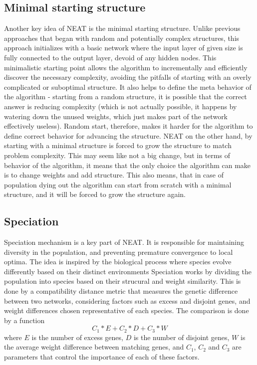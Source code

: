 \documentclass{article}
\begin{document}
\subsection{Minimal starting structure}
Another key idea of NEAT is the minimal starting structure. Unlike previous approaches that began with random and potentially complex structures, 
this approach initializes with a basic network where the input layer of given size is fully connected to the output layer, devoid of any hidden nodes.
This minimalistic starting point allows the algorithm to incrementally and efficiently discover the necessary complexity, avoiding the pitfalls of starting
with an overly complicated or suboptimal structure. It also helps to define the meta behavior of the algorithm - starting from a random structure, it is
possible that the correct answer is reducing complexity (which is not actually possible, it happens by watering down the unused weights, which just makes
part of the network effectively useless). Random start, therefore, makes it harder for the algorithm to define correct behavior for advancing the structure.
NEAT on the other hand, by starting with a minimal structure is forced to grow the structure to match problem complexity. This may seem like not a big
change, but in terms of behavior of the algorithm, it means that the only choice the algorithm can make is to change weights and add structure. This also means,
that in case of population dying out the algorithm can start from scratch with a minimal structure, and it will be forced to grow the structure again. 

\subsection{Speciation}
Speciation mechanism is a key part of NEAT.
It is responsible for maintaining diversity in the population, and preventing premature convergence to local optima.
The idea is inspired by the biological process where species evolve differently based on their distinct environments
Speciation works by dividing the population into species based on their strucural and weight similarity.
This is done by a compatibility distance metric that measures the genetic difference between two networks, 
considering factors such as excess and disjoint genes, and weight differences chosen representative of each species. 
The comparison is done by a function
$$C_1*E + C_2*D + C_3*W$$
where $E$ is the number of excess genes, $D$ is the number of disjoint genes, $W$ is the average weight difference between matching genes, 
and $C_1$, $C_2$ and $C_3$ are parameters that control the importance of each of these factors. 
\end{document}

